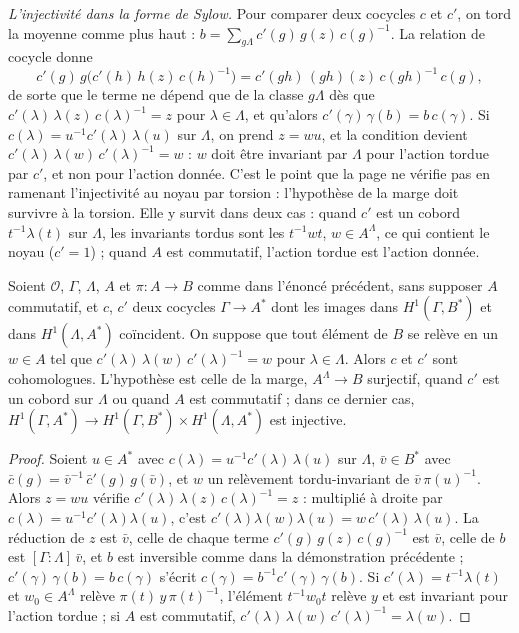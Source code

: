 \noindent\emph{L'injectivité dans la forme de Sylow.} Pour comparer deux cocycles $c$ et $c'$, on tord la moyenne comme plus haut : $b = \sum_{g\Lambda} c'(g)\,g(z)\,c(g)^{-1}$. La relation de cocycle donne
\[ c'(g)\,g\bigl(c'(h)\,h(z)\,c(h)^{-1}\bigr) = c'(gh)\,(gh)(z)\,c(gh)^{-1}\,c(g), \]
de sorte que le terme ne dépend que de la classe $g\Lambda$ dès que $c'(\lambda)\,\lambda(z)\,c(\lambda)^{-1} = z$ pour $\lambda \in \Lambda$, et qu'alors $c'(\gamma)\,\gamma(b) = b\,c(\gamma)$. Si $c(\lambda) = u^{-1}c'(\lambda)\,\lambda(u)$ sur $\Lambda$, on prend $z = wu$, et la condition devient $c'(\lambda)\,\lambda(w)\,c'(\lambda)^{-1} = w$ : $w$ doit être invariant par $\Lambda$ pour l'action tordue par $c'$, et non pour l'action donnée. C'est le point que la page ne vérifie pas en ramenant l'injectivité au noyau par torsion : l'hypothèse de la marge doit survivre à la torsion. Elle y survit dans deux cas : quand $c'$ est un cobord $t^{-1}\lambda(t)$ sur $\Lambda$, les invariants tordus sont les $t^{-1}wt$, $w \in A^\Lambda$, ce qui contient le noyau ($c' = 1$) ; quand $A$ est commutatif, l'action tordue est l'action donnée.

\begin{encadre}
\begin{enonce}
Soient $\mathcal O$, $\Gamma$, $\Lambda$, $A$ et $\pi : A \to B$ comme dans l'énoncé précédent, sans supposer $A$ commutatif, et $c$, $c'$ deux cocycles $\Gamma \to A^*$ dont les images dans $H^1(\Gamma, B^*)$ et dans $H^1(\Lambda, A^*)$ coïncident. On suppose que tout élément de $B$ se relève en un $w \in A$ tel que $c'(\lambda)\,\lambda(w)\,c'(\lambda)^{-1} = w$ pour $\lambda \in \Lambda$. Alors $c$ et $c'$ sont cohomologues. L'hypothèse est celle de la marge, $A^\Lambda \to B$ surjectif, quand $c'$ est un cobord sur $\Lambda$ ou quand $A$ est commutatif ; dans ce dernier cas, $H^1(\Gamma, A^*) \to H^1(\Gamma, B^*) \times H^1(\Lambda, A^*)$ est injective.
\end{enonce}
\end{encadre}

\begin{proof}
Soient $u \in A^*$ avec $c(\lambda) = u^{-1}c'(\lambda)\,\lambda(u)$ sur $\Lambda$, $\bar v \in B^*$ avec $\bar c(g) = \bar v^{-1}\,\bar c'(g)\,g(\bar v)$, et $w$ un relèvement tordu-invariant de $\bar v\,\pi(u)^{-1}$. Alors $z = wu$ vérifie $c'(\lambda)\,\lambda(z)\,c(\lambda)^{-1} = z$ : multiplié à droite par $c(\lambda) = u^{-1}c'(\lambda)\lambda(u)$, c'est $c'(\lambda)\lambda(w)\lambda(u) = w\,c'(\lambda)\,\lambda(u)$. La réduction de $z$ est $\bar v$, celle de chaque terme $c'(g)\,g(z)\,c(g)^{-1}$ est $\bar v$, celle de $b$ est $[\Gamma:\Lambda]\,\bar v$, et $b$ est inversible comme dans la démonstration précédente ; $c'(\gamma)\,\gamma(b) = b\,c(\gamma)$ s'écrit $c(\gamma) = b^{-1}c'(\gamma)\,\gamma(b)$. Si $c'(\lambda) = t^{-1}\lambda(t)$ et $w_0 \in A^\Lambda$ relève $\pi(t)\,y\,\pi(t)^{-1}$, l'élément $t^{-1}w_0t$ relève $y$ et est invariant pour l'action tordue ; si $A$ est commutatif, $c'(\lambda)\,\lambda(w)\,c'(\lambda)^{-1} = \lambda(w)$.
\end{proof}

